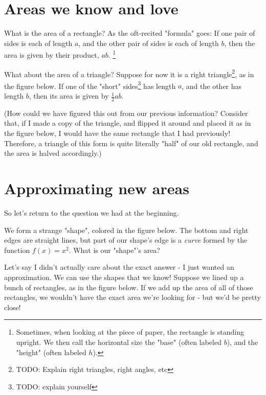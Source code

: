 \documentclass{book}
\begin{document}
\section{Areas we know and love}

What is the area of a rectangle? As the oft-recited "formula" goes: If one pair of sides is each of length $a$, and the other pair of sides is each of length $b$, then the area is given by their product, $ab$. \footnote{Sometimes, when looking at the piece of paper, the rectangle is standing upright. We then call the horizontal size the "base" (often labeled $b$), and the "height" (often labeled $h$).}



What about the area of a triangle? Suppose for now it is a right triangle\footnote{TODO: Explain right triangles, right angles, etc}, as in the figure below. If one of the "short" sides\footnote{TODO: explain yourself} has length $a$, and the other has length $b$, then its area is given by $\frac{1}{2}ab$. 


(How could we have figured this out from our previous information? Consider that, if I made a copy of the triangle, and flipped it around and placed it as in the figure below,  I would have the same rectangle that I had previously! Therefore, a triangle of this form is quite literally "half" of our old rectangle, and the area is halved accordingly.)



\section{Approximating new areas}

So let's return to the question we had at the beginning.

We form a strange "shape", colored in the figure below. The bottom and right edges are straight lines, but part of our shape's edge is a \textit{curve} formed by the function $f(x) = x^2$. What is our "shape"'s area?



Let's say I didn't actually care about the exact answer - I just wanted an approximation. We can use the shapes that we know! Suppose we lined up a bunch of rectangles, as in the figure below. If we add up the area of all of those rectangles, we wouldn't have the exact area we're looking for - but we'd be pretty close!
\end{document}
